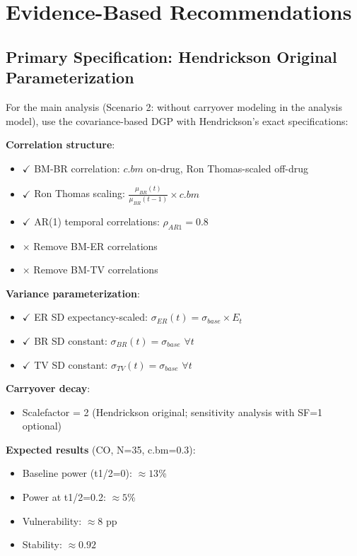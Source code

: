 \documentclass[12pt,a4paper]{article}
\begin{document}
\section{Evidence-Based Recommendations}

\subsection{Primary Specification: Hendrickson Original Parameterization}

For the main analysis (Scenario 2: without carryover modeling in the analysis model), use the covariance-based DGP with Hendrickson's exact specifications:

\textbf{Correlation structure}:
\begin{itemize}
\item \(\checkmark\) BM-BR correlation: $c.bm$ on-drug, Ron Thomas-scaled off-drug
\item \(\checkmark\) Ron Thomas scaling: $\frac{\mu_{BR}(t)}{\mu_{BR}(t-1)} \times c.bm$
\item \(\checkmark\) AR(1) temporal correlations: $\rho_{AR1} = 0.8$
\item \(\times\) Remove BM-ER correlations
\item \(\times\) Remove BM-TV correlations
\end{itemize}

\textbf{Variance parameterization}:
\begin{itemize}
\item \(\checkmark\) ER SD expectancy-scaled: $\sigma_{ER}(t) = \sigma_{base} \times E_t$
\item \(\checkmark\) BR SD constant: $\sigma_{BR}(t) = \sigma_{base}$ $\forall t$
\item \(\checkmark\) TV SD constant: $\sigma_{TV}(t) = \sigma_{base}$ $\forall t$
\end{itemize}

\textbf{Carryover decay}:
\begin{itemize}
\item Scalefactor = 2 (Hendrickson original; sensitivity analysis with SF=1 optional)
\end{itemize}

\textbf{Expected results} (CO, N=35, c.bm=0.3):
\begin{itemize}
\item Baseline power (t1/2=0): $\approx 13$\%
\item Power at t1/2=0.2: $\approx 5$\%
\item Vulnerability: $\approx 8$ pp
\item Stability: $\approx 0.92$
\end{itemize}
\end{document}
